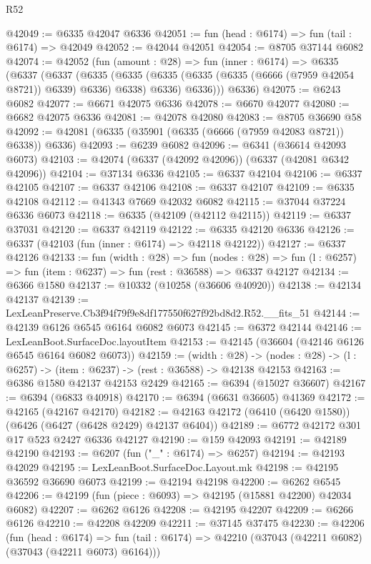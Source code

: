 \begin{lexlean}{R52}
\begin{coremodule}
@42049 := @6335 @42047 @6336
@42051 := fun (head : @6174) => fun (tail : @6174) => @42049
@42052 := @42044 @42051
@42054 := @8705 @37144 @6082
@42074 := @42052
    (fun (amount : @28) =>
    fun (inner : @6174) =>
    @6335
      (@6337
        (@6337
          (@6335
            (@6335 (@6335 (@6335 (@6335 (@6666 (@7959 @42054 @8721)) @6339) @6336) @6338) @6336)
            @6336)))
      @6336)
@42075 := @6243 @6082
@42077 := @6671 @42075 @6336
@42078 := @6670 @42077
@42080 := @6682 @42075 @6336
@42081 := @42078 @42080
@42083 := @8705 @36690 @58
@42092 := @42081 (@6335 (@35901 (@6335 (@6666 (@7959 @42083 @8721)) @6338)) @6336)
@42093 := @6239 @6082
@42096 := @6341 (@36614 @42093 @6073)
@42103 := @42074 (@6337 (@42092 @42096)) (@6337 (@42081 @6342 @42096))
@42104 := @37134 @6336
@42105 := @6337 @42104
@42106 := @6337 @42105
@42107 := @6337 @42106
@42108 := @6337 @42107
@42109 := @6335 @42108
@42112 := @41343 @7669 @42032 @6082
@42115 := @37044 @37224 @6336 @6073
@42118 := @6335 (@42109 (@42112 @42115))
@42119 := @6337 @37031
@42120 := @6337 @42119
@42122 := @6335 @42120 @6336
@42126 := @6337 (@42103 (fun (inner : @6174) => @42118 @42122))
@42127 := @6337 @42126
@42133 := fun (width : @28) =>
  fun (nodes : @28) => fun (l : @6257) => fun (item : @6237) => fun (rest : @36588) => @6337 @42127
@42134 := @6366 @1580
@42137 := @10332 (@10258 (@36606 @40920))
@42138 := @42134 @42137
@42139 := LexLeanPreserve.Cb3f94f79f9e8df177550f627f92bd8d2.R52.__fits_51
@42144 := @42139 @6126 @6545 @6164 @6082 @6073
@42145 := @6372 @42144
@42146 := LexLeanBoot.SurfaceDoc.layoutItem
@42153 := @42145 (@36604 (@42146 @6126 @6545 @6164 @6082 @6073))
@42159 := (width : @28) ->
  (nodes : @28) -> (l : @6257) -> (item : @6237) -> (rest : @36588) -> @42138 @42153
@42163 := @6386 @1580 @42137 @42153 @2429
@42165 := @6394 (@15027 @36607)
@42167 := @6394 (@6833 @40918)
@42170 := @6394 (@6631 @36605) @41369
@42172 := @42165 (@42167 @42170)
@42182 := @42163 @42172 (@6410 (@6420 @1580)) (@6426 (@6427 (@6428 @2429) @42137 @6404))
@42189 := @6772 @42172 @301 @17 @523 @2427 @6336 @42127
@42190 := @159 @42093
@42191 := @42189 @42190
@42193 := @6207 (fun ("_" : @6174) => @6257)
@42194 := @42193 @42029
@42195 := LexLeanBoot.SurfaceDoc.Layout.mk
@42198 := @42195 @36592 @36690 @6073
@42199 := @42194 @42198
@42200 := @6262 @6545
@42206 := @42199 (fun (piece : @6093) => @42195 (@15881 @42200) @42034 @6082)
@42207 := @6262 @6126
@42208 := @42195 @42207
@42209 := @6266 @6126
@42210 := @42208 @42209
@42211 := @37145 @37475
@42230 := @42206
    (fun (head : @6174) =>
    fun (tail : @6174) => @42210 (@37043 (@42211 @6082) (@37043 (@42211 @6073) @6164)))

\end{coremodule}
\end{lexlean}
